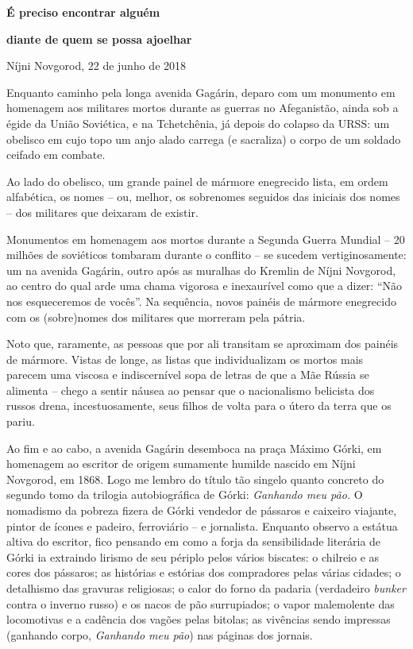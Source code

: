 \textbf{É preciso encontrar alguém }

\textbf{diante de quem se possa ajoelhar}

Níjni Novgorod, 22 de junho de 2018

Enquanto caminho pela longa avenida Gagárin, deparo com um monumento em
homenagem aos militares mortos durante as guerras no Afeganistão, ainda
sob a égide da União Soviética, e na Tchetchênia, já depois do colapso
da URSS: um obelisco em cujo topo um anjo alado carrega (e sacraliza) o
corpo de um soldado ceifado em combate.

Ao lado do obelisco, um grande painel de mármore enegrecido lista, em
ordem alfabética, os nomes -- ou, melhor, os sobrenomes seguidos das
iniciais dos nomes -- dos militares que deixaram de existir.

Monumentos em homenagem aos mortos durante a Segunda Guerra Mundial --
20 milhões de soviéticos tombaram durante o conflito -- se sucedem
vertiginosamente: um na avenida Gagárin, outro após as muralhas do
Kremlin de Níjni Novgorod, ao centro do qual arde uma chama vigorosa e
inexaurível como que a dizer: ``Não nos esqueceremos de vocês''. Na
sequência, novos painéis de mármore enegrecido com os (sobre)nomes dos
militares que morreram pela pátria.

Noto que, raramente, as pessoas que por ali transitam se aproximam dos
painéis de mármore. Vistas de longe, as listas que individualizam os
mortos mais parecem uma viscosa e indiscernível sopa de letras de que a
Mãe Rússia se alimenta -- chego a sentir náusea ao pensar que o
nacionalismo belicista dos russos drena, incestuosamente, seus filhos de
volta para o útero da terra que os pariu.

Ao fim e ao cabo, a avenida Gagárin desemboca na praça Máximo Górki, em
homenagem ao escritor de origem sumamente humilde nascido em Níjni
Novgorod, em 1868. Logo me lembro do título tão singelo quanto concreto
do segundo tomo da trilogia autobiográfica de Górki: \emph{Ganhando meu
pão.} O nomadismo da pobreza fizera de Górki vendedor de pássaros e
caixeiro viajante, pintor de ícones e padeiro, ferroviário -- e
jornalista. Enquanto observo a estátua altiva do escritor, fico pensando
em como a forja da sensibilidade literária de Górki ia extraindo lirismo
de seu périplo pelos vários biscates: o chilreio e as cores dos
pássaros; as histórias e estórias dos compradores pelas várias cidades;
o detalhismo das gravuras religiosas; o calor do forno da padaria
(verdadeiro \emph{bunker} contra o inverno russo) e os nacos de pão
surrupiados; o vapor malemolente das locomotivas e a cadência dos vagões
pelas bitolas; as vivências sendo impressas (ganhando corpo,
\emph{Ganhando meu pão}) nas páginas dos jornais.

